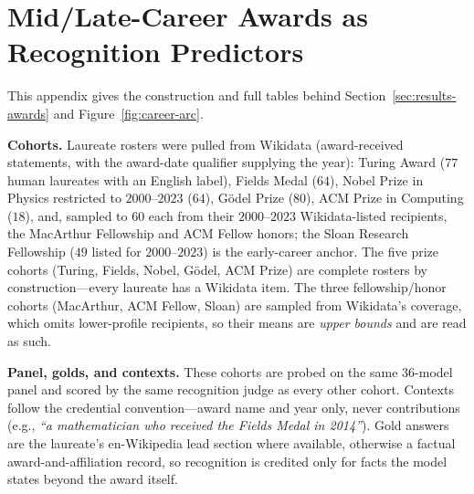 

\section{Mid/Late-Career Awards as Recognition Predictors}
\label{app:awards}

This appendix gives the construction and full tables behind Section~\ref{sec:results-awards} and Figure~\ref{fig:career-arc}.

\textbf{Cohorts.} Laureate rosters were pulled from Wikidata (award-received statements, with the award-date qualifier supplying the year): Turing Award ($77$ human laureates with an English label), Fields Medal ($64$), Nobel Prize in Physics restricted to $2000$--$2023$ ($64$), G\"odel Prize ($80$), ACM Prize in Computing ($18$), and, sampled to $60$ each from their $2000$--$2023$ Wikidata-listed recipients, the MacArthur Fellowship and ACM Fellow honors; the Sloan Research Fellowship ($49$ listed for $2000$--$2023$) is the early-career anchor. The five prize cohorts (Turing, Fields, Nobel, G\"odel, ACM Prize) are complete rosters by construction---every laureate has a Wikidata item. The three fellowship/honor cohorts (MacArthur, ACM Fellow, Sloan) are sampled from Wikidata's coverage, which omits lower-profile recipients, so their means are \emph{upper bounds} and are read as such.

\textbf{Panel, golds, and contexts.} These cohorts are probed on the same $36$-model panel and scored by the same recognition judge as every other cohort. Contexts follow the credential convention---award name and year only, never contributions (e.g., \emph{``a mathematician who received the Fields Medal in 2014''}). Gold answers are the laureate's en-Wikipedia lead section where available, otherwise a factual award-and-affiliation record, so recognition is credited only for facts the model states beyond the award itself.

